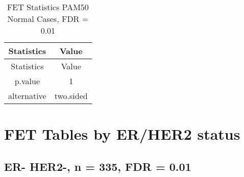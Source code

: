 \documentclass[]{article}
\begin{document}
\begin{longtable}[]{@{}cc@{}}
\caption{FET Statistics PAM50 Normal Cases, FDR = 0.01}\tabularnewline
\toprule
\begin{minipage}[b]{0.18\columnwidth}\centering\strut
Statistics\strut
\end{minipage} & \begin{minipage}[b]{0.14\columnwidth}\centering\strut
Value\strut
\end{minipage}\tabularnewline
\midrule
\endfirsthead
\toprule
\begin{minipage}[b]{0.18\columnwidth}\centering\strut
Statistics\strut
\end{minipage} & \begin{minipage}[b]{0.14\columnwidth}\centering\strut
Value\strut
\end{minipage}\tabularnewline
\midrule
\endhead
\begin{minipage}[t]{0.18\columnwidth}\centering\strut
p.value\strut
\end{minipage} & \begin{minipage}[t]{0.14\columnwidth}\centering\strut
1\strut
\end{minipage}\tabularnewline
\begin{minipage}[t]{0.18\columnwidth}\centering\strut
alternative\strut
\end{minipage} & \begin{minipage}[t]{0.14\columnwidth}\centering\strut
two.sided\strut
\end{minipage}\tabularnewline
\bottomrule
\end{longtable}

\pagebreak

\section{FET Tables by ER/HER2
status}\label{fet-tables-by-erher2-status}

\subsection{ER- HER2-, n = 335, FDR =
0.01}\label{er--her2--n-335-fdr-0.01}
\end{document}
